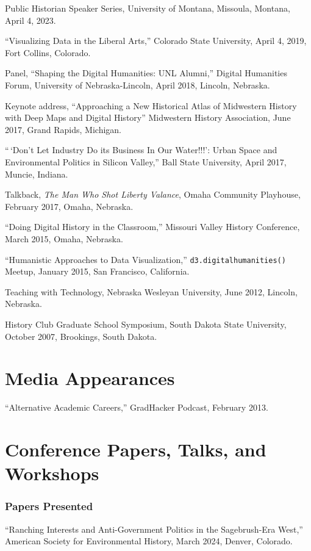 Public Historian Speaker Series, University of Montana, Missoula,
Montana, April 4, 2023.

``Visualizing Data in the Liberal Arts,'' Colorado State University,
April 4, 2019, Fort Collins, Colorado.

Panel, ``Shaping the Digital Humanities: UNL Alumni,'' Digital
Humanities Forum, University of Nebraska-Lincoln, April 2018, Lincoln,
Nebraska.

Keynote address, ``Approaching a New Historical Atlas of Midwestern
History with Deep Maps and Digital History'' Midwestern History
Association, June 2017, Grand Rapids, Michigan.

``\,`Don't Let Industry Do its Business In Our Water!!!': Urban Space
and Environmental Politics in Silicon Valley,'' Ball State University,
April 2017, Muncie, Indiana.

Talkback, \emph{The Man Who Shot Liberty Valance}, Omaha Community
Playhouse, February 2017, Omaha, Nebraska.

``Doing Digital History in the Classroom,'' Missouri Valley History
Conference, March 2015, Omaha, Nebraska.

``Humanistic Approaches to Data Visualization,''
\texttt{d3.digitalhumanities()} Meetup, January 2015, San Francisco,
California.

Teaching with Technology, Nebraska Wesleyan University, June 2012,
Lincoln, Nebraska.

History Club Graduate School Symposium, South Dakota State University,
October 2007, Brookings, South Dakota.

\section{Media Appearances}\label{media-appearances}

``Alternative Academic Careers,'' GradHacker Podcast, February 2013.

\section{Conference Papers, Talks, and
Workshops}\label{conference-papers-talks-and-workshops}

\subsubsection{Papers Presented}\label{papers-presented}

``Ranching Interests and Anti-Government Politics in the Sagebrush-Era
West,'' American Society for Environmental History, March 2024, Denver,
Colorado.

